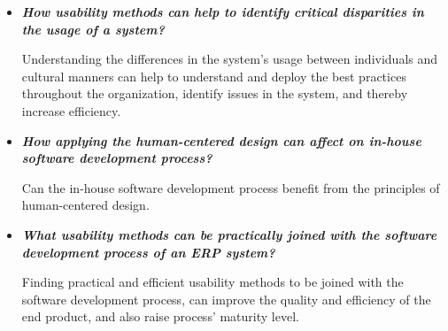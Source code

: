\documentclass[12pt,a4paper,oneside,pdftex]{report}
\begin{document}
\begin{itemize}
\item \textbf{\emph{How usability methods can help to identify critical disparities in the usage of a system?}}

Understanding the differences in the system's usage between individuals and cultural manners can help to understand and deploy the best practices throughout the organization, identify issues in the system, and thereby increase efficiency.

\item \textbf{\emph{How applying the human-centered design can affect on in-house software development process?}}

Can the in-house software development process benefit from the principles of human-centered design.

\item \textbf{\emph{What usability methods can be practically joined with the software development process of an ERP system?}}

Finding practical and efficient usability methods to be joined with the software development process, can improve the quality and efficiency of the end product, and also raise process' maturity level.

\end{itemize}




\end{document}
